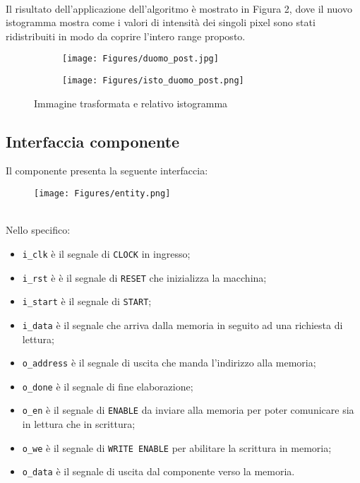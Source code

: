 \documentclass{article}
\begin{document}
\\Il risultato dell'applicazione dell'algoritmo è mostrato in Figura 2, dove il nuovo istogramma mostra come i valori di intensità dei singoli pixel sono stati ridistribuiti in modo da coprire l'intero range proposto.
\begin{figure}[h]
\begin{subfigure}{0.4\textwidth}
\texttt{[image: Figures/duomo\_post.jpg]} 
\label{fig:subim1}
\end{subfigure}
\begin{subfigure}{0.6\textwidth}
\texttt{[image: Figures/isto\_duomo\_post.png]}
\label{fig:subim2}
\end{subfigure}
\caption{Immagine trasformata e relativo istogramma}
\label{fig:image2}
\end{figure}
\newpage

\subsection{Interfaccia componente}
Il componente presenta la seguente interfaccia:
\begin{figure}[h]
\texttt{[image: Figures/entity.png]} 
\label{fig:subim1}

\end{figure}
\\Nello specifico:
\begin{itemize}
    \item \verb^i_clk^ è il segnale di \verb^CLOCK^ in ingresso;
    \item \verb^i_rst^ è è il segnale di \verb^RESET^ che inizializza la macchina;
    \item \verb^i_start^ è il segnale di \verb^START^;
    \item \verb^i_data^ è il segnale che arriva dalla memoria in seguito ad una richiesta di lettura;
    \item \verb^o_address^ è il segnale di uscita che manda l’indirizzo alla memoria;
    \item \verb^o_done^ è il segnale di fine elaborazione;
    \item \verb^o_en^ è il segnale di \verb^ENABLE^ da inviare alla memoria per poter comunicare sia in lettura che in scrittura;
    \item \verb^o_we^ è il segnale di \verb^WRITE ENABLE^ per abilitare la scrittura in memoria;
    \item \verb^o_data^ è il segnale di uscita dal componente verso la memoria.
\end{itemize}
\end{document}
